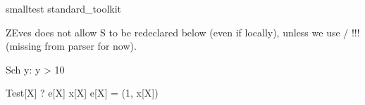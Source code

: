 \begin{zsection}
\SECTION smalltest \parents standard\_toolkit
\end{zsection}

ZEves does not allow S to be redeclared below (even if locally), unless we use \Local  /  \Global!!! (missing from parser for now).
\begin{schema}{Sch}
   y: \nat
\where
   y > 10
\end{schema}



\begin{theorem}{Test}[X]
   \vdash? e[X] \in \langle x[X] \rangle  \iff  e[X] = (1, x[X])
\end{theorem}
